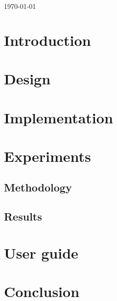 \documentclass[11pt,a4paper,oneside,titlepage]{article}
\begin{document}
\begin{titlepage}
		
		{\large \today}\\[2cm] %
		
		
		
		
		\vfill %
		
	\end{titlepage}

	\section{Introduction} \label{sec:intro}
		
		
	\section{Design} \label{sec:design}
		
		
	\section{Implementation} \label{sec:implementation}
		
			
	\section{Experiments} \label{sec:experiments}
		\subsection{Methodology} \label{subsec:methodology}
			
			
		\subsection{Results} \label{subsec:results}
			
	
	\section{User guide} \label{sec:guide}
		
	
	\section{Conclusion} \label{sec:conclusions}
		
	
\end{document}
